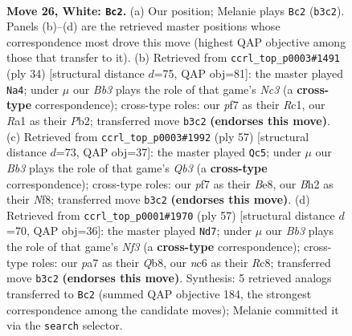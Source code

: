 \documentclass[11pt]{article}
\begin{document}
\clearpage

\begin{figure}[p]\centering
\begin{subfigure}{0.46\textwidth}\centering
\resizebox{\linewidth}{!}{%
\newchessgame
\chessboard[
  setfen={r5k1/pp3pb1/1nn2qp1/3p4/3P3p/1B5P/PP3PPB/RN2Q1K1 w - - 2 26},
  showmover=false,
  pgfstyle=straightmove, color=movearrow, markmove={b3-c2}
]}
\caption{}
\end{subfigure}\hfill
\begin{subfigure}{0.46\textwidth}\centering
\resizebox{\linewidth}{!}{%
\newchessgame
\chessboard[
  setfen={r5k1/1p1q1pp1/p1n2nbp/3p4/3P1BP1/2N2P2/PP4BP/2RQ2K1 w - - 1 18},
  showmover=false,
  pgfstyle=straightmove, color=movearrow, markmove={c3-a4}
]}
\caption{}
\end{subfigure}
\\[4pt]
\begin{subfigure}{0.46\textwidth}\centering
\resizebox{\linewidth}{!}{%
\newchessgame
\chessboard[
  setfen={4bnk1/r5p1/1q1bp2p/1p6/2p1B3/2N1PN1P/1PQ2PP1/1R4K1 b - - 1 29},
  showmover=false,
  pgfstyle=straightmove, color=movearrow, markmove={b6-c5}
]}
\caption{}
\end{subfigure}\hfill
\begin{subfigure}{0.46\textwidth}\centering
\resizebox{\linewidth}{!}{%
\newchessgame
\chessboard[
  setfen={1qr3k1/5pp1/p3pn1p/1b6/pP2P3/P3QN1P/5PP1/1BR3K1 b - - 5 29},
  showmover=false,
  pgfstyle=straightmove, color=movearrow, markmove={f6-d7}
]}
\caption{}
\end{subfigure}
\caption{\textbf{Move 26, White: \texttt{Bc2}.} (a) Our position; Melanie plays \texttt{Bc2} (\texttt{b3c2}). Panels (b)--(d) are the retrieved master positions whose correspondence most drove this move (highest QAP objective among those that transfer to it). (b) Retrieved from \texttt{ccrl\_top\_p0003\#1491} (ply 34) [structural distance $d$=75, QAP obj=81]: the master played \texttt{Na4}; under $\mu$ our \emph{Bb3} plays the role of that game's \emph{Nc3} (a \textbf{cross-type} correspondence); cross-type roles: our \emph{p}f7 as their \emph{R}c1, our \emph{R}a1 as their \emph{P}b2; transferred move \texttt{b3c2} \textbf{(endorses this move)}. (c) Retrieved from \texttt{ccrl\_top\_p0003\#1992} (ply 57) [structural distance $d$=73, QAP obj=37]: the master played \texttt{Qc5}; under $\mu$ our \emph{Bb3} plays the role of that game's \emph{Qb3} (a \textbf{cross-type} correspondence); cross-type roles: our \emph{p}f7 as their \emph{B}e8, our \emph{B}h2 as their \emph{N}f8; transferred move \texttt{b3c2} \textbf{(endorses this move)}. (d) Retrieved from \texttt{ccrl\_top\_p0001\#1970} (ply 57) [structural distance $d$=70, QAP obj=36]: the master played \texttt{Nd7}; under $\mu$ our \emph{Bb3} plays the role of that game's \emph{Nf3} (a \textbf{cross-type} correspondence); cross-type roles: our \emph{p}a7 as their \emph{Q}b8, our \emph{n}c6 as their \emph{R}c8; transferred move \texttt{b3c2} \textbf{(endorses this move)}. Synthesis: 5 retrieved analogs transferred to \texttt{Bc2} (summed QAP objective 184, the strongest correspondence among the candidate moves); Melanie committed it via the \texttt{search} selector.}
\label{fig:thought-m50}
\end{figure}
\end{document}
